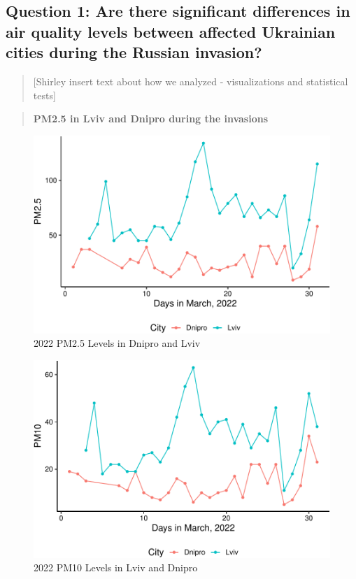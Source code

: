 \documentclass[
  12pt,
]{article}
\begin{document}
\hypertarget{question-1-are-there-significant-differences-in-air-quality-levels-between-affected-ukrainian-cities-during-the-russian-invasion}{%
\subsection{Question 1: Are there significant differences in air quality
levels between affected Ukrainian cities during the Russian
invasion?}\label{question-1-are-there-significant-differences-in-air-quality-levels-between-affected-ukrainian-cities-during-the-russian-invasion}}

\begin{quote}
{[}Shirley insert text about how we analyzed - visualizations and
statistical tests{]}
\end{quote}

\begin{quote}
\textbf{PM2.5 in Lviv and Dnipro during the invasions}
\end{quote}

\begin{figure}
\centering
\includegraphics{Fontanie_Gordon_Weinberg_Project_files/figure-latex/Plotting Lviv vs Dnipro PM25-1.pdf}
\caption{2022 PM2.5 Levels in Dnipro and Lviv}
\end{figure}

\begin{figure}
\centering
\includegraphics{Fontanie_Gordon_Weinberg_Project_files/figure-latex/Plotting Lviv and Dnipro PM10-1.pdf}
\caption{2022 PM10 Levels in Lviv and Dnipro}
\end{figure}
\end{document}
